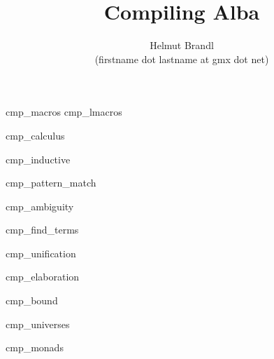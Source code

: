\documentclass[12pt]{article}
\begin{document}


\title{
    Compiling Alba
}

\author{
    Helmut Brandl
    \\
    \scriptsize (firstname dot lastname at gmx dot net)
}
\date{}

\maketitle




\tableofcontents

 {cmp_macros}
 {cmp_lmacros}

\lstset{language=alba}

 {cmp_calculus}

 {cmp_inductive}

 {cmp_pattern_match}

 {cmp_ambiguity}

 {cmp_find_terms}

 {cmp_unification}

 {cmp_elaboration}

 {cmp_bound}

 {cmp_universes}

 {cmp_monads}



{}

\end{document}
